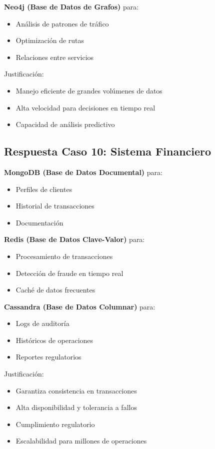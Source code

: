 \documentclass[12pt]{article}
\begin{document}
\textbf{Neo4j (Base de Datos de Grafos)} para:
\begin{itemize}
    \item Análisis de patrones de tráfico
    \item Optimización de rutas
    \item Relaciones entre servicios
\end{itemize}

Justificación:
\begin{itemize}
    \item Manejo eficiente de grandes volúmenes de datos
    \item Alta velocidad para decisiones en tiempo real
    \item Capacidad de análisis predictivo
\end{itemize}

\subsection{Respuesta Caso 10: Sistema Financiero}

\textbf{MongoDB (Base de Datos Documental)} para:
\begin{itemize}
    \item Perfiles de clientes
    \item Historial de transacciones
    \item Documentación
\end{itemize}

\textbf{Redis (Base de Datos Clave-Valor)} para:
\begin{itemize}
    \item Procesamiento de transacciones
    \item Detección de fraude en tiempo real
    \item Caché de datos frecuentes
\end{itemize}

\textbf{Cassandra (Base de Datos Columnar)} para:
\begin{itemize}
    \item Logs de auditoría
    \item Históricos de operaciones
    \item Reportes regulatorios
\end{itemize}

Justificación:
\begin{itemize}
    \item Garantiza consistencia en transacciones
    \item Alta disponibilidad y tolerancia a fallos
    \item Cumplimiento regulatorio
    \item Escalabilidad para millones de operaciones
\end{itemize}
\end{document}
